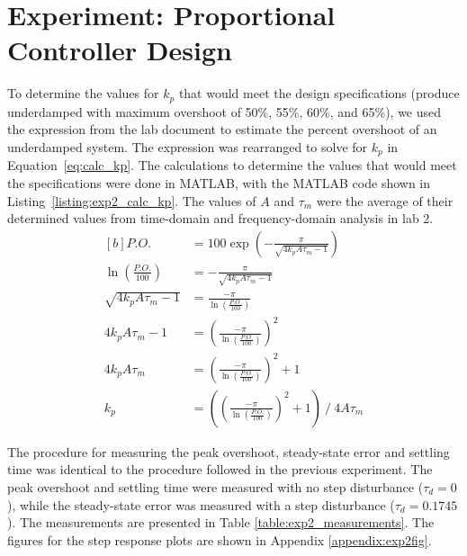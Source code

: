\documentclass[12pt]{article}
\begin{document}
\section{Experiment: Proportional Controller Design}
To determine the values for $k_p$ that would meet the design specifications (produce underdamped with maximum overshoot of 50\%, 55\%, 60\%, and 65\%), we used the expression from the lab document to estimate the percent overshoot of an underdamped system. The expression was rearranged to solve for $k_p$ in Equation~\ref{eq:calc_kp}. The calculations to determine the values that would meet the specifications were done in MATLAB, with the MATLAB code shown in Listing~\ref{listing:exp2_calc_kp}. The values of $A$ and $\tau_m$ were the average of their determined values from time-domain and frequency-domain analysis in lab 2.
\begin{equation} \label{eq:calc_kp}
\begin{aligned}[b]
    P.O. &= 100\exp\left( -\frac{\pi}{\sqrt{4k_pA\tau_m-1}} \right) \\
    \ln\left(\frac{P.O.}{100}\right) &= -\frac{\pi}{\sqrt{4k_pA\tau_m-1}} \\
    \sqrt{4k_pA\tau_m-1} &= \frac{-\pi}{\ln\left(\frac{P.O.}{100}\right)} \\
    4k_pA\tau_m - 1 &= \left(\frac{-\pi}{\ln\left(\frac{P.O.}{100}\right)}\right)^2 \\
    4k_pA\tau_m &= \left(\frac{-\pi}{\ln\left(\frac{P.O.}{100}\right)}\right)^2 + 1 \\
    k_p &= \left( \left(\frac{-\pi}{\ln\left(\frac{P.O.}{100}\right)}\right)^2 + 1 \right) \ / \ 4A\tau_m
\end{aligned}
\end{equation}


The procedure for measuring the peak overshoot, steady-state error and settling time was identical to the procedure followed in the previous experiment. The peak overshoot and settling time were measured with no step disturbance ($\tau_d = 0$), while the steady-state error was measured with a step disturbance ($\tau_d = 0.1745$). The measurements are presented in Table \ref{table:exp2_measurements}. The figures for the step response plots are shown in Appendix \ref{appendix:exp2fig}.
\end{document}
